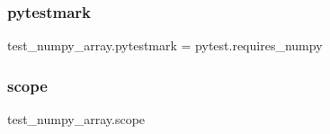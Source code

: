 \subsubsection{\texorpdfstring{pytestmark}{pytestmark}}
{\footnotesize\ttfamily test\+\_\+numpy\+\_\+array.\+pytestmark = pytest.\+requires\+\_\+numpy}

\mbox{\label{namespacetest__numpy__array_aa4b6292fe8f749e6fd777bdd55de22e6}} 
\subsubsection{\texorpdfstring{scope}{scope}}
{\footnotesize\ttfamily test\+\_\+numpy\+\_\+array.\+scope}

